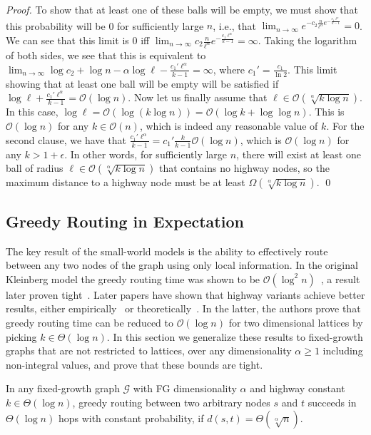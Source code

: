 \begin{proof}
    To show that at least one of these balls will be empty, we must show that
    this probability will be 0 for sufficiently large $n$, i.e., that
    $\lim_{n \to \infty} e^{-c_2 \frac{n}{\ell^\alpha} e^{-\frac{c_1
    \ell^\alpha}{k - 1}}} = 0$.
    We can see that this limit is 0 iff $\lim_{n \to \infty} c_2
    \frac{n}{\ell^\alpha} e^{-\frac{c_1 \ell^\alpha}{k - 1}} = \infty$.
    Taking the logarithm of both sides, we see that this is equivalent to
    $\lim_{n \to \infty} \log{c_2} + \log{n} - \alpha \log{\ell} - \frac{c_1'
    \ell^\alpha}{k - 1} = \infty$, where $c_1' = \frac{c_1}{\ln{2}}$.
    This limit showing that at least one ball will be empty will be satisfied if
    $\log{\ell} + \frac{c_1' \ell^\alpha}{k - 1} = \mathcal{O}(\log{n})$.
    Now let us finally assume that $\ell \in \mathcal{O}(\sqrt[\alpha]{k \log{n}})$.
    In this case, $\log{\ell} = \mathcal{O}(\log(k \log{n})) = \mathcal{O}(\log{k} +
    \log{\log{n}})$.
    This is $\mathcal{O}(\log{n})$ for any $k \in \mathcal{O}(n)$, which is indeed any
    reasonable value of $k$.
    For the second clause, we have that $\frac{c_1' \ell^\alpha}{k - 1} =
    c_1' \frac{k}{k - 1} \mathcal{O}(\log{n})$, which is $\mathcal{O}(\log{n})$ for any $k > 1 +
    \epsilon$.
    In other words, for sufficiently large $n$, there will exist at least one
    ball of radius $\ell \in \mathcal{O}(\sqrt[\alpha]{k \log{n}})$ that contains no
    highway nodes, so the maximum distance to a highway node must be at least
    $\Omega(\sqrt[\alpha]{k \log{n}})$.
    \qed
\end{proof}

\subsection{Greedy Routing in Expectation}
%
The key result of the small-world models is the ability to effectively
route between any two nodes of the graph using only local information.
In the original Kleinberg model the greedy routing time was shown to be
$\mathcal{O}(\log^2{n})$~\cite{kleinberg2000small}, a result later
proven tight~\cite{martel}.
Later papers have shown that highway variants achieve better results, either
empirically~\cite{goodrich2022modeling} or theoretically~\cite{gila2023highway}.
In the latter, the authors prove that greedy routing time can be reduced to 
$\mathcal{O}(\log{n})$ for two dimensional lattices by picking $k \in \Theta(\log{n})$.
In this section we generalize these results to fixed-growth graphs that are not
restricted to lattices, over any dimensionality $\alpha \ge 1$ including
non-integral values, and prove that these bounds are tight.
%
\begin{theorem} \label{thm:greedy-routing-exp} In any fixed-growth graph
    $\mathcal{G}$ with FG dimensionality $\alpha$ and highway constant $k \in
    \Theta(\log{n})$, greedy routing between two arbitrary nodes $s$ and $t$ succeeds in $\Theta(\log{n})$ hops with constant probability, if $d(s, t) =
    \Theta(\sqrt[\alpha]{n})$.
\end{theorem}

